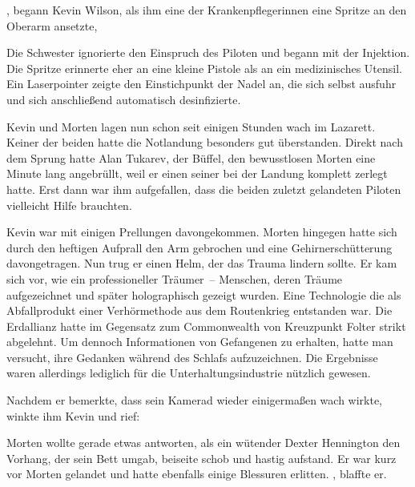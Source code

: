, begann Kevin Wilson, als ihm eine der Krankenpflegerinnen eine Spritze an den Oberarm ansetzte, 

\par

Die Schwester ignorierte den Einspruch des Piloten und begann mit der Injektion. Die Spritze erinnerte eher an eine kleine Pistole als an ein medizinisches Utensil. Ein Laserpointer zeigte den Einstichpunkt der Nadel an, die sich selbst ausfuhr und sich anschließend automatisch desinfizierte.

\par

Kevin und Morten lagen nun schon seit einigen Stunden wach im Lazarett. Keiner der beiden hatte die Notlandung besonders gut überstanden. Direkt nach dem Sprung hatte Alan Tukarev, der Büffel, den bewusstlosen Morten eine Minute lang angebrüllt, weil er einen seiner  bei der Landung komplett zerlegt hatte. Erst dann war ihm aufgefallen, dass die beiden zuletzt gelandeten Piloten vielleicht Hilfe brauchten.

\par

Kevin war mit einigen Prellungen davongekommen. Morten hingegen hatte sich durch den heftigen Aufprall den Arm gebrochen und eine Gehirnerschütterung davongetragen. Nun trug er einen Helm, der das Trauma lindern sollte. Er kam sich vor, wie ein professioneller Träumer~-- Menschen, deren Träume aufgezeichnet und später holographisch gezeigt wurden. Eine Technologie die als Abfallprodukt einer Verhörmethode aus dem Routenkrieg entstanden war. Die Erdallianz hatte im Gegensatz zum Commonwealth von Kreuzpunkt Folter strikt abgelehnt. Um dennoch Informationen von Gefangenen zu erhalten, hatte man versucht, ihre Gedanken während des Schlafs aufzuzeichnen. Die Ergebnisse waren allerdings lediglich für die Unterhaltungsindustrie nützlich gewesen.

\par

Nachdem er bemerkte, dass sein Kamerad wieder einigermaßen wach wirkte, winkte ihm Kevin und rief: 

\par

Morten wollte gerade etwas antworten, als ein wütender Dexter Hennington den Vorhang, der sein Bett umgab, beiseite schob und hastig aufstand. Er war kurz vor Morten gelandet und hatte ebenfalls einige Blessuren erlitten. , blaffte er. 

